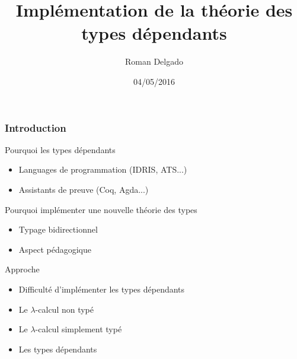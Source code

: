 \documentclass{beamer}
\title{Implémentation de la théorie des types dépendants}
\author{Roman Delgado}
\institute[\textsc{Upmc}]{Université Pierre et Marie Curie}
\date{04/05/2016}
\begin{document}
\begin{frame}

\titlepage

\end{frame}


\begin{frame}
  \frametitle{Introduction}

  \begin{block}{Pourquoi les types dépendants}
    \begin{itemize}
    \item Languages de programmation (IDRIS, ATS...)
    \item Assistants de preuve (Coq, Agda...)
    \end{itemize}
  \end{block}

  \begin{block}{Pourquoi implémenter une nouvelle théorie des types}
    \begin{itemize}
    \item Typage bidirectionnel
    \item Aspect pédagogique
    \end{itemize}
  \end{block}  
  \begin{block}{Approche}
    \begin{itemize}
    \item Difficulté d'implémenter les types dépendants 

    \item Le $\lambda$-calcul non typé 
    \item Le $\lambda$-calcul simplement typé 
    \item Les types dépendants
    \end{itemize}
  \end{block}

\end{frame}
\newenvironment{bnf}
               {\[\begin{array}{lcl@{\qquad}r}}
               {\end{array}\]}
\end{document}
